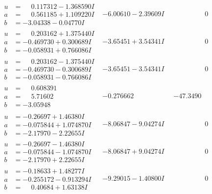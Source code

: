 \documentclass[1p]{elsarticle_modified}
\theoremstyle{definition}
\begin{document}
$$\begin{array}{c|c|c}
\begin{aligned}
u &= \phantom{-}0.117312 - 1.368590 I \\
a &= \phantom{-}0.561185 + 1.109220 I \\
b &= -3.04338 - 0.04770 I\end{aligned}
 & -6.00610 - 2.39609 I & \phantom{-0.000000 } 0 \\ \hline\begin{aligned}
u &= \phantom{-}0.203162 + 1.375440 I \\
a &= -0.469730 + 0.300689 I \\
b &= -0.058931 + 0.766086 I\end{aligned}
 & -3.65451 + 3.54341 I & \phantom{-0.000000 } 0 \\ \hline\begin{aligned}
u &= \phantom{-}0.203162 - 1.375440 I \\
a &= -0.469730 - 0.300689 I \\
b &= -0.058931 - 0.766086 I\end{aligned}
 & -3.65451 - 3.54341 I & \phantom{-0.000000 } 0 \\ \hline\begin{aligned}
u &= \phantom{-}0.608391\phantom{ +0.000000I} \\
a &= \phantom{-}5.71602\phantom{ +0.000000I} \\
b &= -3.05948\phantom{ +0.000000I}\end{aligned}
 & -0.276662\phantom{ +0.000000I} & -47.3490\phantom{ +0.000000I} \\ \hline\begin{aligned}
u &= -0.26697 + 1.46380 I \\
a &= -0.075844 + 1.074870 I \\
b &= -2.17970 - 2.22655 I\end{aligned}
 & -8.06847 - 9.04274 I & \phantom{-0.000000 } 0 \\ \hline\begin{aligned}
u &= -0.26697 - 1.46380 I \\
a &= -0.075844 - 1.074870 I \\
b &= -2.17970 + 2.22655 I\end{aligned}
 & -8.06847 + 9.04274 I & \phantom{-0.000000 } 0 \\ \hline\begin{aligned}
u &= -0.18633 + 1.48277 I \\
a &= -0.255172 - 0.913294 I \\
b &= \phantom{-}0.40684 + 1.63138 I\end{aligned}
 & -9.29015 - 1.40800 I & \phantom{-0.000000 } 0 \\ \hline\begin{aligned}

\end{aligned}
\end{array}$$
\end{document}
